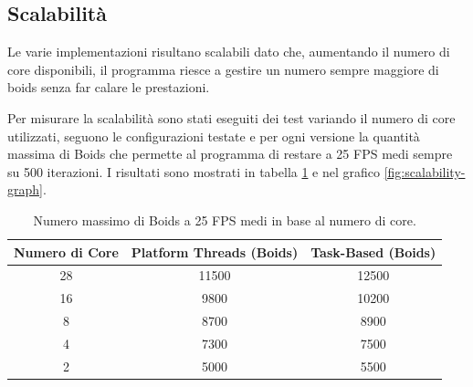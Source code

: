 \documentclass[11pt,notitlepage]{article}
\begin{document}
\subsection{Scalabilità}
Le varie implementazioni risultano scalabili dato che, aumentando il numero di core disponibili, il programma riesce a gestire un numero sempre maggiore di boids senza far calare le prestazioni.

Per misurare la scalabilità sono stati eseguiti dei test variando il numero di core utilizzati, seguono le configurazioni testate e per ogni versione la quantità massima di Boids che permette al programma di restare a 25 FPS medi
sempre su 500 iterazioni. I risultati sono mostrati in tabella \ref{tab:boids-performance} e nel grafico \ref{fig:scalability-graph}.

\begin{table}[H]
    \centering
    \begin{tabular}{|c|c|c|}
        \hline
        \textbf{Numero di Core} & \textbf{Platform Threads (Boids)} & \textbf{Task-Based (Boids)} \\
        \hline
        28 & 11500 & 12500 \\
        \hline
        16 & 9800 & 10200 \\
        \hline
        8  & 8700 & 8900 \\
        \hline
        4  & 7300 & 7500 \\
        \hline
        2  & 5000 & 5500 \\
        \hline
    \end{tabular}
    \caption{Numero massimo di Boids a 25 FPS medi in base al numero di core.}
    \label{tab:boids-performance}
\end{table}
\end{document}
